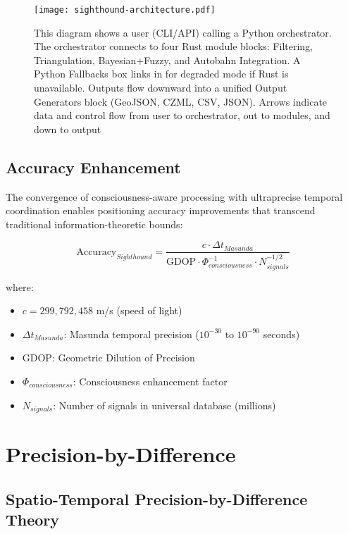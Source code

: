 \documentclass[12pt,a4paper]{article}
\begin{document}
\begin{figure}[H]
\centering
\texttt{[image: sighthound-architecture.pdf]}
\caption{This diagram shows a user (CLI/API) calling a Python orchestrator. The orchestrator connects to four Rust module blocks: Filtering, Triangulation, Bayesian+Fuzzy, and Autobahn Integration. A Python Fallbacks box links in for degraded mode if Rust is unavailable. Outputs flow downward into a unified Output Generators block (GeoJSON, CZML, CSV, JSON). Arrows indicate data and control flow from user to orchestrator, out to modules, and down to output}
\label{fig:sighthound-architecture}
\end{figure}

\subsection{Accuracy Enhancement}

The convergence of consciousness-aware processing with ultraprecise temporal coordination enables positioning accuracy improvements that transcend traditional information-theoretic bounds:

\begin{equation}
\text{Accuracy}_{Sighthound} = \frac{c \cdot \Delta t_{Masunda}}{\text{GDOP} \cdot \Phi_{consciousness}^{-1} \cdot N_{signals}^{-1/2}}
\end{equation}

where:
\begin{itemize}
\item $c = 299,792,458$ m/s (speed of light)
\item $\Delta t_{Masunda}$: Masunda temporal precision ($10^{-30}$ to $10^{-90}$ seconds)
\item $\text{GDOP}$: Geometric Dilution of Precision
\item $\Phi_{consciousness}$: Consciousness enhancement factor
\item $N_{signals}$: Number of signals in universal database (millions)
\end{itemize}

\section{Precision-by-Difference}

\subsection{Spatio-Temporal Precision-by-Difference Theory}
\end{document}
